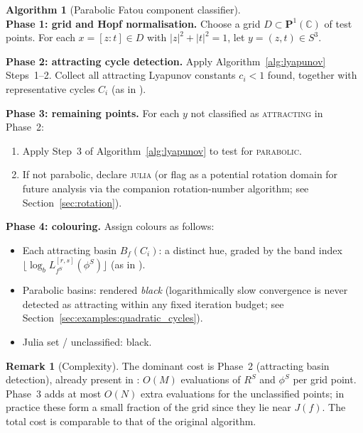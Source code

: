 \documentclass[12pt]{article}
\theoremstyle{definition}
\newtheorem{remark}[theorem]{Remark}
\newtheorem{algorithm_desc}[theorem]{Algorithm}
\newcommand{\C}{\mathbb{C}}
\newcommand{\Pone}{\mathbf{P}^1(\C)}
\newcommand{\RS}{R^S}
\begin{document}
\begin{algorithm_desc}[Parabolic Fatou component classifier]
  \label{alg:full}
  \quad\\
  \textbf{Phase 1: grid and Hopf normalisation.}
  Choose a grid $D \subset \Pone$ of test points.  For each $x=[z:t]\in D$
  with $|z|^2+|t|^2=1$, let $y=(z,t)\in S^3$.

  \textbf{Phase 2: attracting cycle detection.}
  Apply Algorithm~\ref{alg:lyapunov} Steps~1--2.  Collect all attracting
  Lyapunov constants $c_i < 1$ found, together with representative cycles
  $C_i$ (as in \cite[\S4.1]{Alvarez2023}).

  \textbf{Phase 3: remaining points.}
  For each $y$ not classified as \textsc{attracting} in Phase~2:
  \begin{enumerate}[label=3.\arabic*.]
    \item Apply Step~3 of Algorithm~\ref{alg:lyapunov} to test for
          \textsc{parabolic}.
    \item If not parabolic, declare \textsc{julia} (or flag as a potential
          rotation domain for future analysis via the companion
          rotation-number algorithm; see Section~\ref{sec:rotation}).
  \end{enumerate}

  \textbf{Phase 4: colouring.}
  Assign colours as follows:
  \begin{itemize}
    \item Each attracting basin $B_f(C_i)$: a distinct hue, graded by
          the band index $\lfloor \log_b L_{f^S}^{[r,s]}(\phi^S) \rfloor$
          (as in \cite{Alvarez2023}).
    \item Parabolic basins: rendered \emph{black} (logarithmically slow
          convergence is never detected as attracting within any fixed
          iteration budget; see Section~\ref{sec:examples:quadratic_cycles}).
    \item Julia set / unclassified: black.
  \end{itemize}
\end{algorithm_desc}

\begin{remark}[Complexity]
  The dominant cost is Phase~2 (attracting basin detection), already
  present in \cite{Alvarez2023}: $O(M)$ evaluations of $\RS$ and $\phi^S$
  per grid point.  Phase~3 adds at most $O(N)$ extra evaluations for the
  unclassified points; in practice these form a small fraction of the grid
  since they lie near $J(f)$.  The total cost is comparable to that of the
  original algorithm.
\end{remark}
\end{document}
